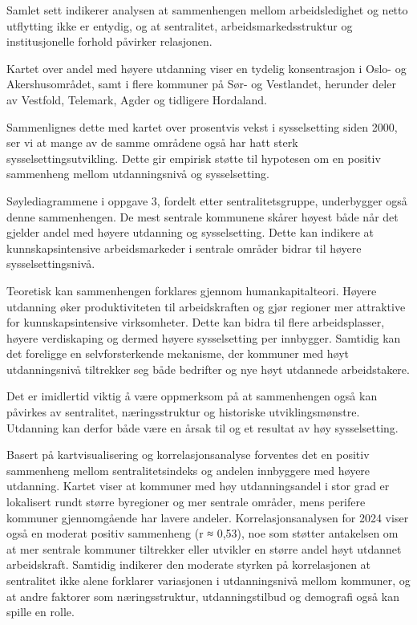 \documentclass[
  norsk,
  letterpaper,
  DIV=11,
  numbers=noendperiod]{scrartcl}
\begin{document}
Samlet sett indikerer analysen at sammenhengen mellom arbeidsledighet og
netto utflytting ikke er entydig, og at sentralitet,
arbeidsmarkedsstruktur og institusjonelle forhold påvirker relasjonen.

Kartet over andel med høyere utdanning viser en tydelig konsentrasjon i
Oslo- og Akershusområdet, samt i flere kommuner på Sør- og Vestlandet,
herunder deler av Vestfold, Telemark, Agder og tidligere Hordaland.

Sammenlignes dette med kartet over prosentvis vekst i sysselsetting
siden 2000, ser vi at mange av de samme områdene også har hatt sterk
sysselsettingsutvikling. Dette gir empirisk støtte til hypotesen om en
positiv sammenheng mellom utdanningsnivå og sysselsetting.

Søylediagrammene i oppgave 3, fordelt etter sentralitetsgruppe,
underbygger også denne sammenhengen. De mest sentrale kommunene skårer
høyest både når det gjelder andel med høyere utdanning og sysselsetting.
Dette kan indikere at kunnskapsintensive arbeidsmarkeder i sentrale
områder bidrar til høyere sysselsettingsnivå.

Teoretisk kan sammenhengen forklares gjennom humankapitalteori. Høyere
utdanning øker produktiviteten til arbeidskraften og gjør regioner mer
attraktive for kunnskapsintensive virksomheter. Dette kan bidra til
flere arbeidsplasser, høyere verdiskaping og dermed høyere sysselsetting
per innbygger. Samtidig kan det foreligge en selvforsterkende mekanisme,
der kommuner med høyt utdanningsnivå tiltrekker seg både bedrifter og
nye høyt utdannede arbeidstakere.

Det er imidlertid viktig å være oppmerksom på at sammenhengen også kan
påvirkes av sentralitet, næringsstruktur og historiske
utviklingsmønstre. Utdanning kan derfor både være en årsak til og et
resultat av høy sysselsetting.

Basert på kartvisualisering og korrelasjonsanalyse forventes det en
positiv sammenheng mellom sentralitetsindeks og andelen innbyggere med
høyere utdanning. Kartet viser at kommuner med høy utdanningsandel i
stor grad er lokalisert rundt større byregioner og mer sentrale områder,
mens perifere kommuner gjennomgående har lavere andeler.
Korrelasjonsanalysen for 2024 viser også en moderat positiv sammenheng
(r ≈ 0,53), noe som støtter antakelsen om at mer sentrale kommuner
tiltrekker eller utvikler en større andel høyt utdannet arbeidskraft.
Samtidig indikerer den moderate styrken på korrelasjonen at sentralitet
ikke alene forklarer variasjonen i utdanningsnivå mellom kommuner, og at
andre faktorer som næringsstruktur, utdanningstilbud og demografi også
kan spille en rolle.
\end{document}
